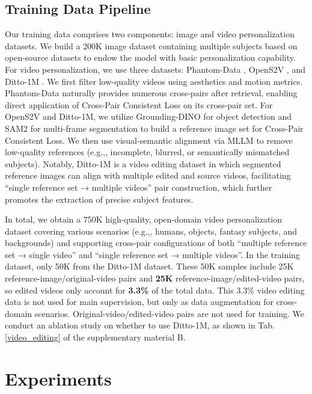\documentclass{llmxive}
\providecommand{\eg}{e.g.,\xspace}
\begin{document}
\subsection{Training Data Pipeline}
\label{data_pipeline}
Our training data comprises two components: image and video personalization datasets. We build a 200K image dataset containing multiple subjects based on open-source datasets \cite{UNO,echo-4o} to endow the model with basic personalization capability. For video personalization, we use three datasets: Phantom-Data \cite{phantom-data}, OpenS2V \cite{yuan2025opens2v}, and Ditto-1M \cite{zhang2025region}. We first filter low-quality videos using aesthetics and motion metrics. Phantom-Data naturally provides numerous cross-pairs after retrieval, enabling direct application of Cross-Pair Consistent Loss on its cross-pair set. For OpenS2V and Ditto-1M, we utilize Grounding-DINO \cite{groundingdino} for object detection and SAM2 \cite{sam2} for multi-frame segmentation to build a reference image set for Cross-Pair Consistent Loss. We then use visual-semantic alignment via MLLM \cite{qwen25} to remove low-quality references (\eg, incomplete, blurred, or semantically mismatched subjects). Notably, Ditto-1M is a video editing dataset in which segmented reference images can align with multiple edited and source videos, facilitating ``single reference set → multiple videos'' pair construction, which further promotes the extraction of precise subject features. 

In total, we obtain a 750K high-quality, open-domain video personalization dataset covering various scenarios (\eg, humans, objects, fantasy subjects, and backgrounds) and supporting cross-pair configurations of both ``multiple reference set → single video'' and ``single reference set → multiple videos''.  In the training dataset, only 50K from the Ditto-1M dataset. These 50K samples include 25K reference-image/original-video pairs and \textbf{25K} reference-image/edited-video pairs, so edited videos only account for \textbf{3.3\%} of the total data. This 3.3\% video editing data is not used for main supervision, but only as data augmentation for cross-domain scenarios. Original-video/edited-video pairs are not used for training. We conduct an ablation study on whether to use Ditto-1M, as shown in Tab. \ref{video_editing} of the supplementary material B.


\section{Experiments}
\end{document}
